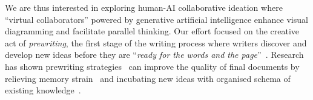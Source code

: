 We are thus interested in exploring  human-AI collaborative ideation where ``virtual collaborators'' powered by generative artificial intelligence enhance visual diagramming and facilitate parallel thinking.
Our effort focused on the creative act of \textit{prewriting}, the first stage of the writing process where writers discover and develop new ideas before they are ``\textit{ready for the words and the page}''~\cite{rohman1965pre}.
Research has shown prewriting strategies~\cite{barnett1989writing,rohman1965pre} can improve the quality of final documents by relieving memory strain~\cite{flower1981cognitive,kellogg1990effectiveness} and incubating new ideas with organised schema of existing knowledge~\cite{lorenz2009using,davies2011concept}.

